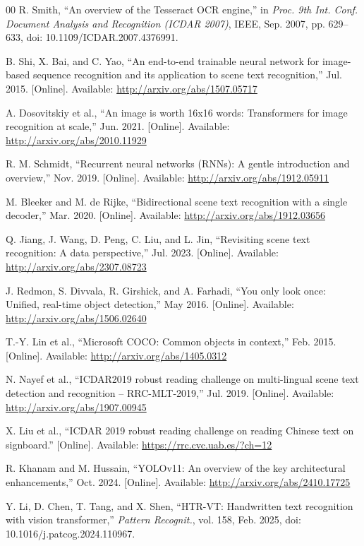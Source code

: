 \documentclass{ieeeaccess}
\begin{document}
{\begin{thebibliography}{00}
 R. Smith, ``An overview of the Tesseract OCR engine,'' in
  \textit{Proc. 9th Int. Conf. Document Analysis and Recognition (ICDAR 2007)},
  IEEE, Sep. 2007, pp. 629--633, doi: 10.1109/ICDAR.2007.4376991.

 B. Shi, X. Bai, and C. Yao, ``An end-to-end trainable neural
  network for image-based sequence recognition and its application to scene text
  recognition,'' Jul. 2015. [Online]. Available:
  \url{http://arxiv.org/abs/1507.05717}

 A. Dosovitskiy et al., ``An image is worth 16x16 words:
  Transformers for image recognition at scale,'' Jun. 2021. [Online]. Available:
  \url{http://arxiv.org/abs/2010.11929}

 R. M. Schmidt, ``Recurrent neural networks (RNNs): A gentle
  introduction and overview,'' Nov. 2019. [Online]. Available:
  \url{http://arxiv.org/abs/1912.05911}

 M. Bleeker and M. de Rijke, ``Bidirectional scene text recognition
  with a single decoder,'' Mar. 2020. [Online]. Available:
  \url{http://arxiv.org/abs/1912.03656}

 Q. Jiang, J. Wang, D. Peng, C. Liu, and L. Jin, ``Revisiting scene
  text recognition: A data perspective,'' Jul. 2023. [Online]. Available:
  \url{http://arxiv.org/abs/2307.08723}

 J. Redmon, S. Divvala, R. Girshick, and A. Farhadi, ``You only look
  once: Unified, real-time object detection,'' May 2016. [Online]. Available:
  \url{http://arxiv.org/abs/1506.02640}

 T.-Y. Lin et al., ``Microsoft COCO: Common objects in context,''
  Feb. 2015. [Online]. Available: \url{http://arxiv.org/abs/1405.0312}

 N. Nayef et al., ``ICDAR2019 robust reading challenge on
  multi-lingual scene text detection and recognition -- RRC-MLT-2019,''
  Jul. 2019. [Online]. Available: \url{http://arxiv.org/abs/1907.00945}

 X. Liu et al., ``ICDAR 2019 robust reading challenge on reading
  Chinese text on signboard.'' [Online]. Available:
  \url{https://rrc.cvc.uab.es/?ch=12}

 R. Khanam and M. Hussain, ``YOLOv11: An overview of the key
  architectural enhancements,'' Oct. 2024. [Online]. Available:
  \url{http://arxiv.org/abs/2410.17725}

 Y. Li, D. Chen, T. Tang, and X. Shen, ``HTR-VT: Handwritten text
  recognition with vision transformer,'' \textit{Pattern Recognit.}, vol. 158,
  Feb. 2025, doi: 10.1016/j.patcog.2024.110967.


\end{thebibliography}}
\end{document}
